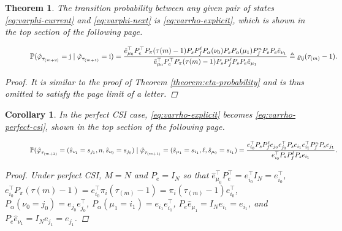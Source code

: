 \documentclass[journal,twoside,web]{ieeecolor}
\newtheorem{theorem}{Theorem}
\newtheorem{corollary}{Corollary}[theorem]
\begin{document}
\begin{theorem}\label{theorem:varphi-probability}
    The transition probability between any given pair of states \eqref{eq:varphi-current} and \eqref{eq:varphi-next} is \eqref{eq:varrho-explicit}, which is shown in the top section of the following page.

\begin{figure}[ht]
\raggedright
\begin{equation}\label{eq:varrho-explicit}
\text{\small $\mathbb{P}(
\hat{\varphi}_{\tau_{(m+2)}}^{} = \mathrm{j} \mid \hat{\varphi}_{\tau_{(m+1)}}^{} = \mathrm{i}) = 
\frac{\hat{e}_{\mu_0}^{\top} P_{e}^{\top} P_{\pi}(\tau{(m)}-1) P_{s} P_{f}^{\ell} P_{\alpha}(\nu_0) P_{s} P_{\alpha}(\mu_1) P_{f}^{n} P_{s} P_{e}\hat{e}_{\nu_1}}{\hat{e}_{\mu_0}^{\top} P_{e}^{\top} P_{\pi}(\tau{(m)}-1) P_{s} P_{f}^{\ell} P_{s} P_{e}\hat{e}_{\mu_1}}$}
\triangleq 
\varrho_{\mathrm{i}\mathrm{j}}(\tau_{(m)}-1).
\end{equation}
\vspace*{-15pt}
\end{figure}

\begin{proof}
    It is similar to the proof of Theorem \ref{theorem:eta-probability} and is thus omitted to satisfy the page limit of a letter.
\end{proof}
\end{theorem}
\begin{corollary}\label{corollary:varrho}
In the \emph{perfect CSI} case, \eqref{eq:varrho-explicit} becomes \eqref{eq:varrho-perfect-csi}, shown in the top section of the following page.

\begin{figure}[ht]
\raggedright
\begin{equation}\label{eq:varrho-perfect-csi}
    \begin{aligned}
    \text{\small $\mathbb{P}(
    \hat{\varphi}_{\tau_{(m+2)}}^{} = (\hat{s}_{\nu_{1}} = s_{j_1},n,\hat{s}_{\nu_{0}} = s_{j_0}) \mid 
    \hat{\varphi}_{\tau_{(m+1)}}^{} = (\hat{s}_{\mu_{1}} = s_{i_1},\ell,\hat{s}_{\mu_{0}}= s_{i_1}) = \frac{e_{i_0}^{\top} P_{s} P_{f}^{\ell} e_{j_0}e_{j_0}^{\top} P_{s} e_{i_1}e_{i_1}^{\top} P_{f}^{n}P_{s} e_{j_1}}{e_{i_0}^{\top} P_{s}P_{f}^{\ell}P_{s}e_{i_1}}.$}
    \end{aligned}
\end{equation}
\end{figure}
\begin{proof}
    Under perfect CSI, $M=N$ and $P_e = I_{N}$ so that $\hat{e}_{\mu_0}^{\top} P_{e}^{\top} = e_{i_0}^{\top} I_{N} = e_{i_0}^{\top}$, $e_{i_0}^{\top} P_{\pi}(\tau{(m)}-1)=e_{i_0}^{\top}\pi_{i}(\tau_{(m)}-1)=\pi_{i}(\tau_{(m)}-1)e_{i_0}^{\top}$, $P_{\alpha}(\nu_0=j_0)=e_{j_0}e_{j_0}^{\top}$, $P_{\alpha}(\mu_1=i_1)=e_{i_1}e_{i_1}^{\top}$, $P_{e}\hat{e}_{\mu_1} = I_{N} e_{i_1}  = e_{i_1}$, and $P_{e}\hat{e}_{\nu_1} = I_{N} e_{j_1}  = e_{j_1}$.
\end{proof}
\end{corollary}
\end{document}
